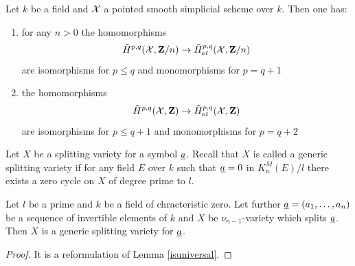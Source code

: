 \documentclass[11pt]{article}
\begin{document}
%
\begin{theorem}
 Let $k$ be a field and $\cal X$ a pointed smooth simplicial
scheme over $k$. Then one has:
%
\begin{enumerate}
\item for any $n>0$ the homomorphisms
%
$$\tilde{H}^{p,q}({\cal X},{\bf Z\rm}/n)\rightarrow \tilde{H}^{p,q}_{et}({\cal X},{\bf Z\rm}/n)$$
%
are isomorphisms for $p\le q$ and monomorphisms for $p=q+1$
%
\item the homomorphisms
%
$$\tilde{H}^{p,q}({\cal X},{\bf Z\rm})\rightarrow \tilde{H}^{p,q}_{et}({\cal X},{\bf Z\rm})$$
%
are isomorphisms for $p\le q+1$ and monomorphisms for $p=q+2$
\end{enumerate}
\end{theorem}
%
Let $X$ be a splitting variety for a symbol $\underline{a}$. Recall that $X$
is called a generic splitting variety if for any field $E$ over $k$
such that $\underline{a}=0$ in $K_n^M(E)/l$ there exists a zero cycle on $X$
of degree prime to $l$.
%
\begin{theorem}
 Let $l$ be a prime and $k$ be a field of chracteristic
zero. Let further $\underline{a}=(a_1,\dots,a_n)$ be a sequence of invertible
elements of $k$ and $X$ be $\nu_{n-1}$-variety which splits
$\underline{a}$. Then $X$ is a generic splitting variety for $\underline{a}$. 
\end{theorem}
%
\begin{proof}
It is a reformulation of Lemma \ref{isuniversal}.
\end{proof}
%
\end{document}
